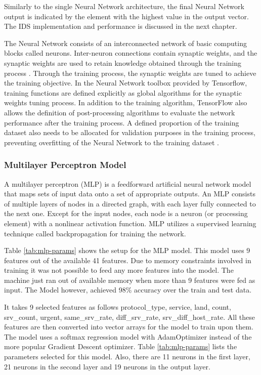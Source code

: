 \documentclass[12pt]{article}
\theoremstyle{definition}
\begin{document}
		Similarly to the single Neural Network architecture, the final Neural Network output is indicated by the
		element with the highest value in the output vector. The IDS implementation and performance is discussed in the next chapter.
		
		The Neural Network consists of an interconnected network of basic computing blocks called
		neurons. Inter-neuron connections contain synaptic weights, and the synaptic weights are
		used to retain knowledge obtained through the training process \cite{Iqbal2016}. Through the training
		process, the synaptic weights are tuned to achieve the training objective. In the Neural Network
		toolbox provided by Tensorflow, training functions are defined explicitly as global
		algorithms for the synaptic weights tuning process. In addition to the training algorithm,
		TensorFlow also allows the definition of post-processing algorithms to evaluate the
		network performance after the training process. A defined proportion of the training
		dataset also needs to be allocated for validation purposes in the training process,
		preventing overfitting of the Neural Network to the training dataset \cite{Iqbal2016}.
		
		\subsubsection{Multilayer Perceptron Model}
		
		A multilayer perceptron (MLP) is a feedforward artificial neural network model that maps sets of input data onto a set of appropriate outputs. An MLP consists of multiple layers of nodes in a directed graph, with each layer fully connected to the next one. Except for the input nodes, each node is a neuron (or processing element) with a nonlinear activation function. MLP utilizes a supervised learning technique called backpropagation for training the network.
		
		Table \ref{tab:mlp-params} shows the setup for the MLP model. This model uses 9 features out of the available 41 features. Due to memory constraints involved in training it was not possible to feed any more features into the model. The machine just ran out of available memory when more than 9 features were fed as input. The Model however, achieved 98\% accuracy over the train and test data.
		
		It takes 9 selected features as follows  protocol\_type, service, land, count, srv\_count, urgent, same\_srv\_rate, diff\_srv\_rate, srv\_diff\_host\_rate. All these features are then converted into vector arrays for the model to train upon them. The model uses a softmax regression model with AdamOptimizer instead of the more popular Gradient Descent optimizer. Table \ref{tab:mlp-params} lists the parameters selected for this model. Also, there are 11 neurons in the first layer, 21 neurons in the second layer and 19 neurons in the output layer.
		
\end{document}
